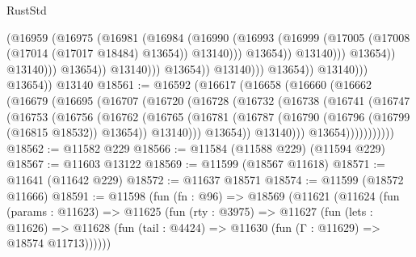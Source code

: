 \begin{lexlean}{RustStd}
\begin{coremodule}
                                                (@16959
                                                  (@16975
                                                    (@16981
                                                      (@16984
                                                        (@16990
                                                          (@16993
                                                            (@16999
                                                              (@17005
                                                                (@17008
                                                                  (@17014 (@17017 @18484) @13654))
                                                                @13140)))
                                                          @13654))
                                                      @13140)))
                                                @13654))
                                            @13140)))
                                      @13654))
                                  @13140)))
                            @13654))
                        @13140)))
                  @13654))
              @13140)))
        @13654))
    @13140
@18561 := @16592
    (@16617
      (@16658
        (@16660
          (@16662
            (@16679
              (@16695
                (@16707
                  (@16720
                    (@16728
                      (@16732
                        (@16738
                          (@16741
                            (@16747
                              (@16753
                                (@16756
                                  (@16762
                                    (@16765
                                      (@16781
                                        (@16787
                                          (@16790 (@16796 (@16799 (@16815 @18532)) @13654))
                                          @13140)))
                                    @13654))
                                @13140)))
                          @13654)))))))))))
@18562 := @11582 @229
@18566 := @11584 (@11588 @229) (@11594 @229)
@18567 := @11603 @13122
@18569 := @11599 (@18567 @11618)
@18571 := @11641 (@11642 @229)
@18572 := @11637 @18571
@18574 := @11599 (@18572 @11666)
@18591 := @11598
    (fun (fn : @96) =>
    @18569
      (@11621
        (@11624
          (fun (params : @11623) =>
          @11625
            (fun (rty : @3975) =>
            @11627
              (fun (lets : @11626) =>
              @11628 (fun (tail : @4424) => @11630 (fun (Γ : @11629) => @18574 @11713))))))

\end{coremodule}
\end{lexlean}
